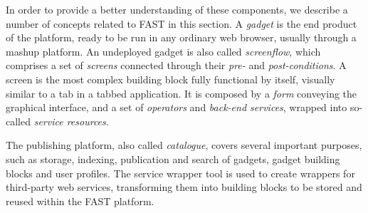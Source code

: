 In order to provide a better understanding of these components, we describe a number of concepts related to FAST in this section. 
A \emph{gadget} is the end product of the platform, ready to be run in any ordinary web browser, usually through a mashup platform. 
An undeployed gadget is also called \emph{screenflow}, which comprises a set of \emph{screens} connected through their \emph{pre-} and \emph{post-conditions}. A screen is the most complex building block fully functional by itself,
visually similar to a tab in a tabbed application.
It is composed by a \emph{form} conveying the graphical interface, and a set of \emph{operators} and \emph{back-end services}, wrapped into so-called \emph{service resources}.

The publishing platform, also called \emph{catalogue}, covers several important purposes, such as storage, indexing, publication and search of gadgets, gadget building blocks and user profiles.
The service wrapper tool is used to create wrappers for third-party web services, transforming them into building blocks to be stored and reused within the FAST platform.
